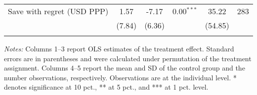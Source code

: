 \begin{table}[h]
{\begin{threeparttable}
\begin{tabular}{l*{5}{c}}
Save with regret (USD PPP)&     1.57&    -7.17&0.00$^{***}$&    35.22&      283\\
          &   (7.84)&   (6.36)&         &  (54.85)&         \\
          &         &         &         &         &         \\
\bottomrule \end{tabular} \begin{tablenotes}[flushleft] \footnotesize \item \emph{Notes:} Columns 1--3 report OLS estimates of the treatment effect. Standard errors are in parentheses and were calculated under permutation of the treatment assignment. Columns 4--5 report the mean and SD of the control group and the number observations, respectively. Observations are at the individual level. * denotes significance at 10 pct., ** at 5 pct., and *** at 1 pct. level. \end{tablenotes} \end{threeparttable} } \end{table}

